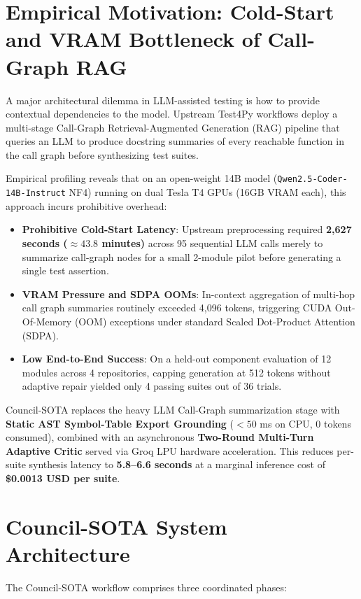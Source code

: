 \documentclass[conference]{IEEEtran}
\begin{document}
\section{Empirical Motivation: Cold-Start and VRAM Bottleneck of Call-Graph RAG}
A major architectural dilemma in LLM-assisted testing is how to provide contextual dependencies to the model. Upstream Test4Py workflows deploy a multi-stage Call-Graph Retrieval-Augmented Generation (RAG) pipeline that queries an LLM to produce docstring summaries of every reachable function in the call graph before synthesizing test suites.

Empirical profiling reveals that on an open-weight 14B model (\texttt{Qwen2.5-Coder-14B-Instruct} NF4) running on dual Tesla T4 GPUs (16GB VRAM each), this approach incurs prohibitive overhead:
\begin{itemize}
    \item \textbf{Prohibitive Cold-Start Latency}: Upstream preprocessing required \textbf{2,627 seconds ($\approx 43.8$ minutes)} across 95 sequential LLM calls merely to summarize call-graph nodes for a small 2-module pilot before generating a single test assertion.
    \item \textbf{VRAM Pressure and SDPA OOMs}: In-context aggregation of multi-hop call graph summaries routinely exceeded 4,096 tokens, triggering CUDA Out-Of-Memory (OOM) exceptions under standard Scaled Dot-Product Attention (SDPA).
    \item \textbf{Low End-to-End Success}: On a held-out component evaluation of 12 modules across 4 repositories, capping generation at 512 tokens without adaptive repair yielded only 4 passing suites out of 36 trials.
\end{itemize}

Council-SOTA replaces the heavy LLM Call-Graph summarization stage with \textbf{Static AST Symbol-Table Export Grounding} ($< 50$ ms on CPU, 0 tokens consumed), combined with an asynchronous \textbf{Two-Round Multi-Turn Adaptive Critic} served via Groq LPU hardware acceleration. This reduces per-suite synthesis latency to \textbf{5.8--6.6 seconds} at a marginal inference cost of \textbf{\$0.0013 USD per suite}.

\section{Council-SOTA System Architecture}
The Council-SOTA workflow comprises three coordinated phases:
\end{document}
